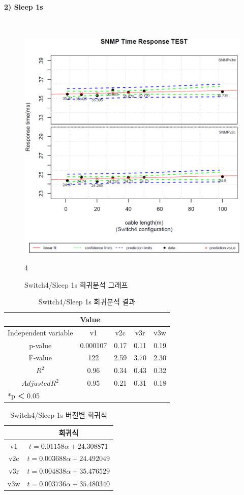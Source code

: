 \documentclass[11pt
  , a4paper
  , article
  , oneside
]{memoir}
\begin{document}
\clearpage
\paragraph{2) Sleep 1s}
   　
\begin{figure}[h!]
  \centering
  \includegraphics[width=0.5 \textwidth]{./images/s4s1.eps}
  \caption{Switch4/Sleep 1s 회귀분석 그래프}
4\end{figure}


\begin{table}[!htb]
\begin{center}
\begin{tabular}{c|c|c|c|c}\hline
& \multicolumn{4}{l}{Value} \\ \hline
Independent variable & v1 & v2c & v3r & v3w \\ \hline\hline
p-value& 0.000107 & 0.17 & 0.11 & 0.19 \\ \hline
F-value& 122 & 2.59 & 3.70 & 2.30 \\ \hline
$  R^2  $ & 0.96 & 0.34 & 0.43 & 0.32 \\\hline
$ Adjusted R^2 $ & 0.95 & 0.21 & 0.31 & 0.18  \\\hline 
\multicolumn{5}{l}{*p ＜ 0.05} \\ \hline
\end{tabular}
\caption{Switch4/Sleep 1s 회귀분석 결과}
\end{center}
\end{table} 

\begin{table}[!htb]
\begin{center}
\begin{tabular}{c|c}\hline
 & 회귀식  \\ \hline\hline
v1 &  $ t=0.01158\alpha + 24.308871 $  \\ 
v2c & $ t=0.003688\alpha + 24.492049 $ \\ 
v3r & $ t=0.004838\alpha + 35.476529 $ \\ 
v3w & $ t=0.003736\alpha + 35.480340 $  \\ \hline
\end{tabular}
\caption{Switch4/Sleep 1s 버전별 회귀식}
\end{center}
\end{table} 
\end{document}
